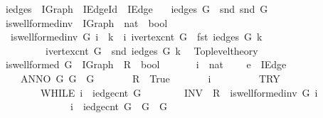 \begin{isabellebody}
\ iedges\ {\isacharcolon}{\isacharcolon}\ {\isachardoublequoteopen}IGraph\ {\isasymRightarrow}\ IEdge{\isacharunderscore}Id\ {\isasymRightarrow}\ IEdge{\isachardoublequoteclose}\isanewline
\ \ \ {\isachardoublequoteopen}iedges\ G\ {\isasymequiv}\ snd\ {\isacharparenleft}snd\ G{\isacharparenright}{\isachardoublequoteclose}\isanewline
\isanewline
{}\isamarkupfalse%
\ is{\isacharunderscore}wellformed{\isacharunderscore}inv\ {\isacharcolon}{\isacharcolon}\ {\isachardoublequoteopen}IGraph\ {\isasymRightarrow}\ nat\ {\isasymRightarrow}\ bool{\isachardoublequoteclose}\ \isanewline
\ \ {\isachardoublequoteopen}is{\isacharunderscore}wellformed{\isacharunderscore}inv\ G\ i\ {\isasymequiv}\ {\isasymforall}k\ {\isacharless}\ i{\isachardot}\ ivertex{\isacharunderscore}cnt\ G\ {\isachargreater}\ fst\ {\isacharparenleft}iedges\ G\ k{\isacharparenright}\isanewline
\ \ \ \ \ \ \ \ {\isasymand}\ ivertex{\isacharunderscore}cnt\ G\ {\isachargreater}\ snd\ {\isacharparenleft}iedges\ G\ k{\isacharparenright}{\isachardoublequoteclose}\isanewline
%
\isadelimML
%
\endisadelimML
%
\isatagML
{}\isamarkupfalse%
\ {\isacharverbatimopen}\ Toplevel{\isachardot}theory\ {\isacharverbatimclose}%
\endisatagML
{\isafoldML}%
%
\isadelimML
\isanewline
%
\endisadelimML
{}\isamarkupfalse%
\ is{\isacharunderscore}wellformed\ {\isacharparenleft}G\ {\isacharcolon}{\isacharcolon}\ IGraph\ {\isacharbar}\ R\ {\isacharcolon}{\isacharcolon}\ bool{\isacharparenright}\isanewline
\ \ \isanewline
\ \ \ \ i\ {\isacharcolon}{\isacharcolon}\ nat\isanewline
\ \ \ \ e\ {\isacharcolon}{\isacharcolon}\ IEdge\isanewline
\ \ \ {\isachardoublequoteopen}\isanewline
\ \ \ \ ANNO\ G{\isachardot}{\isasymlbrace}\ {\isasymacute}G\ {\isacharequal}\ G\ {\isasymrbrace}\isanewline
\ \ \ \ \ \ {\isasymacute}R\ {\isacharcolon}{\isacharequal}{\isacharequal}\ True\ {\isacharsemicolon}{\isacharsemicolon}\isanewline
\ \ \ \ \ \ {\isasymacute}i\ {\isacharcolon}{\isacharequal}{\isacharequal}\ {}\ {\isacharsemicolon}{\isacharsemicolon}\isanewline
\ \ \ \ \ \ TRY\isanewline
\ \ \ \ \ \ \ \ WHILE\ {\isasymacute}i\ {\isacharless}\ iedge{\isacharunderscore}cnt\ {\isasymacute}G\isanewline
\ \ \ \ \ \ \ \ INV\ {\isasymlbrace}\ {\isasymacute}R\ {\isacharequal}\ is{\isacharunderscore}wellformed{\isacharunderscore}inv\ {\isasymacute}G\ {\isasymacute}i\ {\isasymand}\ \isanewline
\ \ \ \ \ \ \ \ \ \ \ \ \ \ {\isasymacute}i\ {\isasymle}\ iedge{\isacharunderscore}cnt\ {\isasymacute}G\ {\isasymand}\ {\isasymacute}G\ {\isacharequal}\ G\ {\isasymrbrace}\isanewline

\end{isabellebody}

